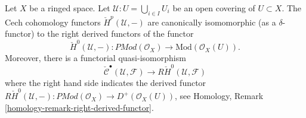 \begin{lemma}
\label{lemma-cech-cohomology-derived-presheaves}
Let $X$ be a ringed space.
Let $\mathcal{U} : U = \bigcup_{i \in I} U_i$
be an open covering of $U \subset X$.
The Cech cohomology functors $\check{H}^p(\mathcal{U}, -)$
are canonically isomomorphic (as a $\delta$-functor) to
the right derived functors of the functor
$$
\check{H}^0(\mathcal{U}, -) :
\textit{PMod}(\mathcal{O}_X)
\longrightarrow
\text{Mod}(\mathcal{O}_X(U)).
$$
Moreover, there is a functorial quasi-isomorphism
$$
\check{\mathcal{C}}^\bullet(\mathcal{U}, \mathcal{F})
\longrightarrow 
R\check{H}^0(\mathcal{U}, \mathcal{F})
$$
where the right hand side indicates the derived functor
$R\check{H}^0(\mathcal{U}, -) :
\textit{PMod}(\mathcal{O}_X)
\to
D^{+}(\mathcal{O}_X(U))$, see
Homology, Remark \ref{homology-remark-right-derived-functor}.
\end{lemma}

